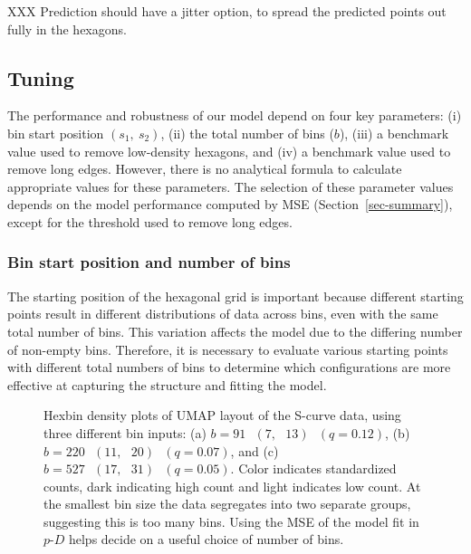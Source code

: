 \documentclass[
  12pt]{article}
\begin{document}
XXX Prediction should have a jitter option, to spread the predicted
points out fully in the hexagons.

\subsection{Tuning}\label{tuning}

The performance and robustness of our model depend on four key
parameters: (i) bin start position \((s_1, \ s_2)\), (ii) the total
number of bins (\(b\)), (iii) a benchmark value used to remove
low-density hexagons, and (iv) a benchmark value used to remove long
edges. However, there is no analytical formula to calculate appropriate
values for these parameters. The selection of these parameter values
depends on the model performance computed by MSE
(Section~\ref{sec-summary}), except for the threshold used to remove
long edges.

\subsubsection{Bin start position and number of
bins}\label{bin-start-position-and-number-of-bins}

The starting position of the hexagonal grid is important because
different starting points result in different distributions of data
across bins, even with the same total number of bins. This variation
affects the model due to the differing number of non-empty bins.
Therefore, it is necessary to evaluate various starting points with
different total numbers of bins to determine which configurations are
more effective at capturing the structure and fitting the model.

\begin{figure}[H]


\caption{\label{fig-bins-scurve}Hexbin density plots of UMAP layout of
the S-curve data, using three different bin inputs: (a)
\(b = 91 \text{ } (7, \text{ }13)  \text{ }(q = 0.12)\), (b)
\(b = 220 \text{ } (11, \text{ }20) \text{ }(q = 0.07)\), and (c)
\(b = 527 \text{ } (17, \text{ }31) \text{ }(q = 0.05)\). Color
indicates standardized counts, dark indicating high count and light
indicates low count. At the smallest bin size the data segregates into
two separate groups, suggesting this is too many bins. Using the MSE of
the model fit in \(p\text{-}D\) helps decide on a useful choice of
number of bins.}

\end{figure}%
\end{document}

